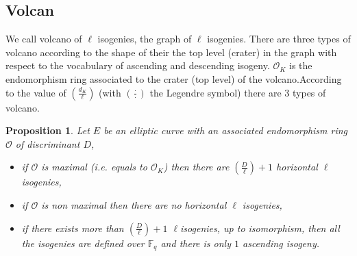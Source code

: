 \documentclass{article}
\theoremstyle{plain}
\newtheorem{prop}[thm]{Proposition}
\theoremstyle{definition}
\theoremstyle{remark}
\begin{document}
\subsection{Volcan}
We call volcano of $\ell$ isogenies, the graph of $\ell$ isogenies. There are three types of volcano according to the shape of their the top level (crater) in the graph with respect to the vocabulary of ascending and descending isogeny. $\mathcal{O}_K$ is the endomorphism ring associated to the crater (top level) of the volcano.According to the value of $\left( \frac{d_{K}}{\ell} \right)$ (with $\left( \frac{\cdot}{\cdot} \right)$ the Legendre symbol) there are $3$ types of volcano.
\begin{prop} %
Let $E$ be an elliptic curve with an associated endomorphism ring $\mathcal{O}$ of discriminant $D$, %
\begin{itemize}
\item if $\mathcal{O}$ is maximal (i.e. equals to $\mathcal{O}_K$) then there are $\left( \frac{D}{\ell} \right) +1 $ horizontal $\ell$ isogenies,
\item if $\mathcal{O}$ is non maximal then there are no horizontal $\ell$ isogenies,
\item if there exists more than $\left( \frac{D}{\ell} \right) +1 $  $\ell$isogenies, up to isomorphism, then all the isogenies are defined over $\mathbb{F}_q$ and there is only $1$ ascending isogeny. 
\end{itemize}
\end{prop} 
\end{document}
